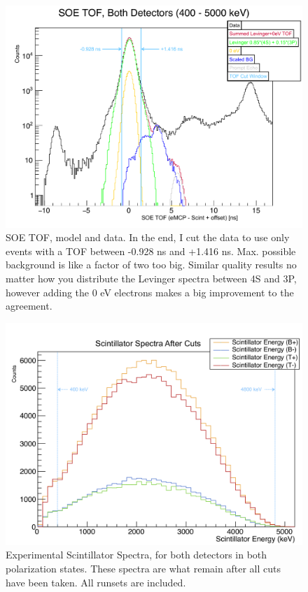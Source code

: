 \begin{figure}[h!!!!tb]
	\centering
	\includegraphics[width=.999\linewidth]
	{Figures/SOE_TOF_Spectra.pdf}
	\caption{SOE TOF, model and data.  In the end, I cut the data to use only events with a TOF between -0.928 ns and +1.416 ns.  Max. possible background is like a factor of two too big.  Similar quality results no matter how you distribute the Levinger spectra between 4S and 3P, however adding the 0 eV electrons makes a big improvement to the agreement. }	
	\label{fig:soetof}
\end{figure}

\begin{figure}[h!!!!tb]
	\centering
	\includegraphics[width=.999\linewidth]
	{Figures/experimental_scintspectra_lin.png}
	\caption[Experimental Scintillator Spectra]{Experimental Scintillator Spectra, for both detectors in both polarization states.  These spectra are what remain after all cuts have been taken.  All runsets are included.}	
	\label{fig:scintspectra}
\end{figure}



